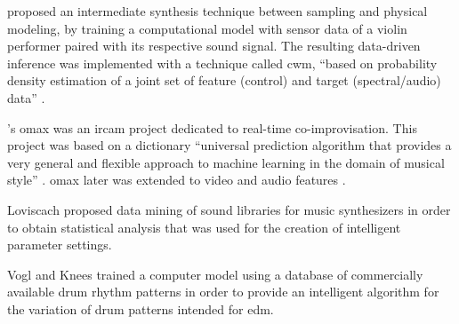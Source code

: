 {	\citeauthor{DBLP:conf/icmc/SchonerCDG98} \parencite{DBLP:conf/icmc/SchonerCDG98} proposed an intermediate synthesis technique between sampling and physical modeling, by training a computational model with sensor data of a violin performer paired with its respective sound signal. The resulting data-driven inference was implemented with a technique called \gls{cwm}, ``based on probability density estimation of a joint set of feature (control) and target (spectral/audio) data'' \parencite{DBLP:conf/icmc/SchonerCDG98}. 

	\citeauthor{DBLP:conf/icmc/AssayagDD99}'s \gls{omax} was an \gls{ircam} project dedicated to real-time co-improvisation. This project was based on a dictionary ``universal prediction algorithm that provides a very general and flexible approach to machine learning in the domain of musical style'' \parencite{DBLP:conf/icmc/AssayagDD99}. \gls{omax} later was extended to video and audio features \parencite{DBLP:conf/icmc/BlochD08}.

	Loviscach \parencite{Loviscach2008} proposed data mining of sound libraries for music synthesizers in order to obtain statistical analysis that was used for the creation of intelligent parameter settings. 

	Vogl and Knees \parencite{rvogl:2017} trained a computer model using a database of commercially available drum rhythm patterns in order to provide an intelligent algorithm for the variation of drum patterns intended for \gls{edm}.

}

